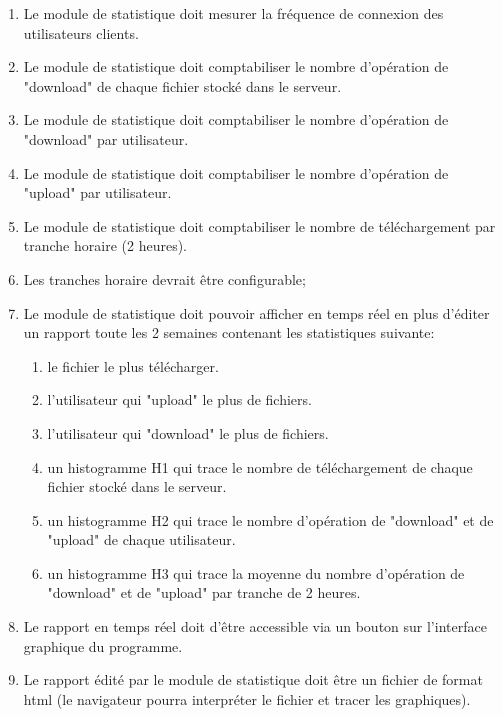\documentclass[10pt,a4paper]{report}
\begin{document}
		\begin{enumerate}
			\item Le module de statistique doit mesurer la fréquence de connexion des utilisateurs clients.

			\item Le module de statistique doit comptabiliser le nombre d'opération de "download" de chaque fichier stocké dans le serveur.

			\item Le module de statistique doit comptabiliser le nombre d'opération de "download" par utilisateur.

			\item Le module de statistique doit comptabiliser le nombre d'opération de "upload" par utilisateur.

			\item Le module de statistique doit comptabiliser le nombre de téléchargement par tranche horaire (2 heures).

			\item Les tranches horaire devrait être configurable;

			\item Le module de statistique doit pouvoir afficher en temps réel en plus d'éditer un rapport toute les 2 semaines contenant les statistiques suivante:

			\begin{enumerate}[label=\arabic*.]
				\item le fichier le plus télécharger.

				\item l'utilisateur qui "upload" le plus de fichiers.

				\item l'utilisateur qui "download" le plus de fichiers.

				\item un histogramme H1 qui trace le nombre de téléchargement de chaque fichier stocké dans le serveur.

				\item un histogramme H2 qui trace le nombre d'opération de "download" et de "upload" de chaque utilisateur.

				\item un histogramme H3 qui trace la moyenne du nombre d'opération de "download" et de "upload" par tranche de 2 heures.
			\end{enumerate}

			\item Le rapport en temps réel doit d'être accessible via un bouton sur l'interface graphique du programme.

			\item Le rapport édité par le module de statistique doit être un fichier de format html (le navigateur pourra interpréter le fichier et tracer les graphiques).
		\end{enumerate}
	
\end{document}
